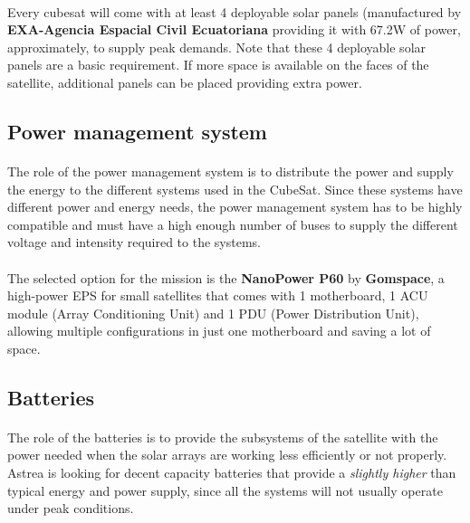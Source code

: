 \paragraph{}Every cubesat will come with at least 4 deployable solar panels (manufactured by \textbf{EXA-Agencia Espacial Civil Ecuatoriana} providing it with 67.2W of power, approximately, to supply peak demands. Note that these 4 deployable solar panels are a basic requirement. If more space is available on the faces of the satellite, additional panels can be placed providing extra power.

\subsection{Power management system}
\paragraph{}The role of the power management system is to distribute the power and supply the energy to the different systems used in the CubeSat. Since these systems have different power and energy needs, the power management system has to be highly compatible and must have a high enough number of buses to supply the different voltage and intensity required to the systems.

\paragraph{}The selected option for the mission is the \textbf{NanoPower P60} by \textbf{Gomspace}, a high-power EPS for small satellites that comes with 1 motherboard, 1 ACU module (Array Conditioning Unit) and 1 PDU (Power Distribution Unit), allowing multiple configurations in just one motherboard and saving a lot of space.


\subsection{Batteries}
\paragraph{}	The role of the batteries is to provide the subsystems of the satellite with the power needed when the solar arrays are working less efficiently or not properly. Astrea is looking for decent capacity batteries that provide a \textit{slightly higher} than typical energy and power supply, since all the systems will not usually operate under peak conditions. 

